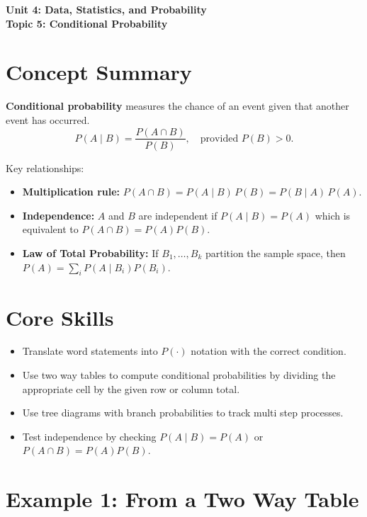 \documentclass[14pt]{extarticle}
\begin{document}
\raggedright
{}

\begin{center}
    \LARGE \textbf{Unit 4: Data, Statistics, and Probability} \\[6pt]
    \Large \textbf{Topic 5: Conditional Probability}
\end{center}

\vspace{1em}

\section*{Concept Summary}

\textbf{Conditional probability} measures the chance of an event given that another event has occurred.  
\[
P(A\mid B)=\frac{P(A\cap B)}{P(B)},\quad \text{provided } P(B)>0.
\]

Key relationships:
\begin{itemize}
  \item \textbf{Multiplication rule:} \(P(A\cap B)=P(A\mid B)\,P(B)=P(B\mid A)\,P(A)\).
  \item \textbf{Independence:} \(A\) and \(B\) are independent if \(P(A\mid B)=P(A)\) which is equivalent to \(P(A\cap B)=P(A)P(B)\).
  \item \textbf{Law of Total Probability:} If \(B_1,\dots,B_k\) partition the sample space, then \(P(A)=\sum_i P(A\mid B_i)P(B_i)\).
\end{itemize}

\section*{Core Skills}
\begin{itemize}
  \item Translate word statements into \(P(\cdot)\) notation with the correct condition.
  \item Use two way tables to compute conditional probabilities by dividing the appropriate cell by the given row or column total.
  \item Use tree diagrams with branch probabilities to track multi step processes.
  \item Test independence by checking \(P(A\mid B)=P(A)\) or \(P(A\cap B)=P(A)P(B)\).
\end{itemize}

\section*{Example 1: From a Two Way Table}
\end{document}
